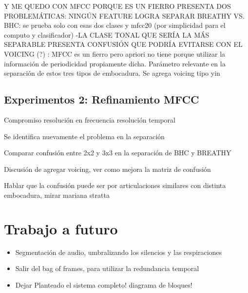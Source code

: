 \documentclass{article}
\begin{document}
Y ME QUEDO CON MFCC PORQUE ES UN FIERRO
PRESENTA DOS PROBLEMÁTICAS: 
NINGÚN FEATURE LOGRA SEPARAR BREATHY VS. BHC: se prueba solo con esas dos clases y mfcc20 (por simplicidad para el computo y clasificador) 
-LA CLASE TONAL QUE SERÍA LA MÁS SEPARABLE PRESENTA CONFUSIÓN QUE PODRÍA EVITARSE CON EL VOICING (?) : MFCC es un fierro pero apriori no tiene porque utilizar la información de periodicidad propiamente dicha. Parámetro relevante en la separación de estos tres tipos de embocadura. Se agrega voicing tipo yin \cite{de2002yin}
 
\subsection{Experimentos 2: Refinamiento MFCC}
Compromiso resolución en frecuencia resolución temporal




Se identifica nuevamente el problema en la separación

Comparar confusión entre 2x2 y 3x3 en la separación de BHC y BREATHY

Discusión de agregar voicing, ver como mejora la matriz de confusión 

Hablar que la confusión puede ser por articulaciones similares con distinta embocadura, mirar mariana stratta

\subsubsection{}


\section{Trabajo a futuro}

\begin{itemize} 
  \item Segmentación de audio, umbralizando los silencios y las respiraciones 
  \item Salir del bag of frames, para utilizar la redundancia temporal
  \item Dejar Planteado el sistema completo! diagrama de bloques!
\end{itemize}


\newpage




\end{document}
